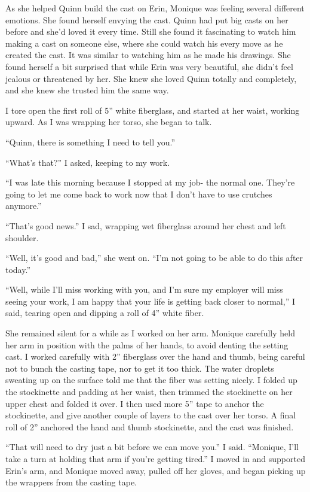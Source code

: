 \begin{thought}
As she helped Quinn build the cast on Erin, Monique was feeling several different emotions.
She found herself envying the cast. Quinn had put big casts on her before and she'd loved it
every time. Still she found it fascinating to watch him making a cast on someone else, where she
could watch his every move as he created the cast. It was similar to watching him as he made his
drawings. She found herself a bit surprised that while Erin was very beautiful, she didn't feel
jealous or threatened by her. She knew she loved Quinn totally and completely, and she knew she
trusted him the same way.
\end{thought}

I tore open the first roll of 5'' white fiberglass, and started at her waist, working
upward. As I was wrapping her torso, she began to talk.

``Quinn, there is something I need to tell you.''

``What's that?'' I asked, keeping to my work.

``I was late this morning because I stopped at my job- the normal one. They're going to let
me come back to work now that I don't have to use crutches anymore.''

``That's good news.'' I sad, wrapping wet fiberglass around her chest and left shoulder.

``Well, it's good and bad,'' she went on. ``I'm not going to be able to do this after today.''

``Well, while I'll miss working with you, and I'm sure my employer will miss seeing your
work, I am happy that your life is getting back closer to normal,'' I said, tearing open and
dipping a roll of 4'' white fiber.

She remained silent for a while as I worked on her arm. Monique carefully held her arm in
position with the palms of her hands, to avoid denting the setting cast. I worked carefully with
2'' fiberglass over the hand and thumb, being careful not to bunch the casting tape, nor to get
it too thick. The water droplets sweating up on the surface told me that the fiber was setting
nicely. I folded up the stockinette and padding at her waist, then trimmed the stockinette on
her upper chest and folded it over. I then used more 5'' tape to anchor the stockinette, and
give
another couple of layers to the cast over her torso. A final roll of 2'' anchored the hand and
thumb stockinette, and the cast was finished.

``That will need to dry just a bit before we can move you.'' I said. ``Monique, I'll take a
turn at holding that arm if you're getting tired.'' I moved in and supported Erin's arm, and
Monique moved away, pulled off her gloves, and began picking up the wrappers from the casting
tape.

